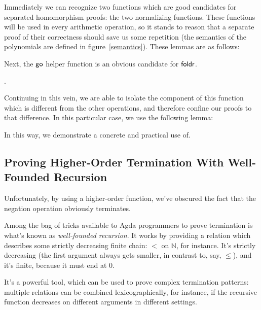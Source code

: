 \documentclass[draft, twocolumn]{article}
\theoremstyle{definition}
\theoremstyle{definition}
\begin{document}

Immediately we can recognize two functions which are good candidates for
separated homomorphism proofs: the two normalizing functions. These functions
will be used in every arithmetic operation, so it stands to reason that a
separate proof of their correctness should save us some repetition (the
semantics of the polynomials are defined in figure~\ref{semantics}). These
lemmas are as follows:


Next, the \(\AgdaFunction{go}\) helper function is an obvious candidate for
\(\AgdaFunction{foldr}\)\footnotemark.

.


Continuing in this vein, we are able to isolate the component of this function
which is different from the other operations, and therefore confine our proofs
to that difference. In this particular case, we use the following lemma:


In this way, we demonstrate a concrete and practical use
of\cite{mu_algebra_2009}.
\subsection{Proving Higher-Order Termination With Well-Founded Recursion}
Unfortunately, by using a higher-order function, we've obscured the fact that
the negation operation obviously terminates.

Among the bag of tricks available to Agda programmers to prove termination is
what's known as \emph{well-founded recursion}\cite{nordstrom_terminating_1987}.
It works by providing a relation which describes some strictly decreasing finite
chain: \(<\) on \(\mathbb{N}\), for instance. It's strictly decreasing (the
first argument always gets smaller, in contrast to, say, \(\leq\)), and it's
finite, because it must end at 0.

It's a powerful tool, which can be used to prove complex termination patterns:
multiple relations can be combined lexicographically, for instance, if the
recursive function decreases on different arguments in different settings.
\end{document}
